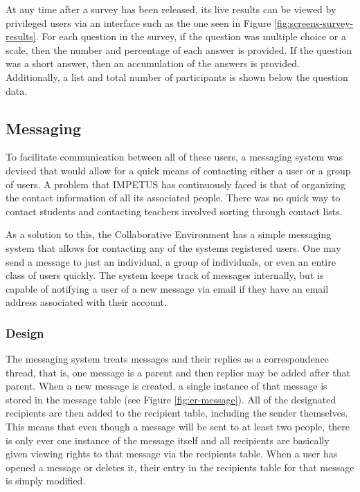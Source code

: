 At any time after a survey has been released, its live results can be viewed by privileged users via an interface such as the one seen in Figure \ref{fig:screens-survey-results}. For each question in the survey, if the question was multiple choice or a scale, then the number and percentage of each answer is provided. If the question was a short answer, then an accumulation of the answers is provided. Additionally, a list and total number of participants is shown below the question data.

\subsection{Messaging}
\label{subsec:design-messaging}
To facilitate communication between all of these users, a messaging system was devised that would allow for a quick means of contacting either a user or a group of users. A problem that IMPETUS has continuously faced is that of organizing the contact information of all its associated people. There was no quick way to contact students and contacting teachers involved sorting through contact lists.

As a solution to this, the Collaborative Environment has a simple messaging system that allows for contacting any of the systems registered users. One may send a message to just an individual, a group of individuals, or even an entire class of users quickly. The system keeps track of messages internally, but is capable of notifying a user of a new message via email if they have an email address associated with their account.

\subsubsection{Design}
The messaging system treats messages and their replies as a correspondence thread, that is, one message is a parent and then replies may be added after that parent. When a new message is created, a single instance of that message is stored in the message table (see Figure \ref{fig:er-message}). All of the designated recipients are then added to the recipient table, including the sender themselves. This means that even though a message will be sent to at least two people, there is only ever one instance of the message itself and all recipients are basically given viewing rights to that message via the recipients table. When a user has opened a message or deletes it, their entry in the recipients table for that message is simply modified.

